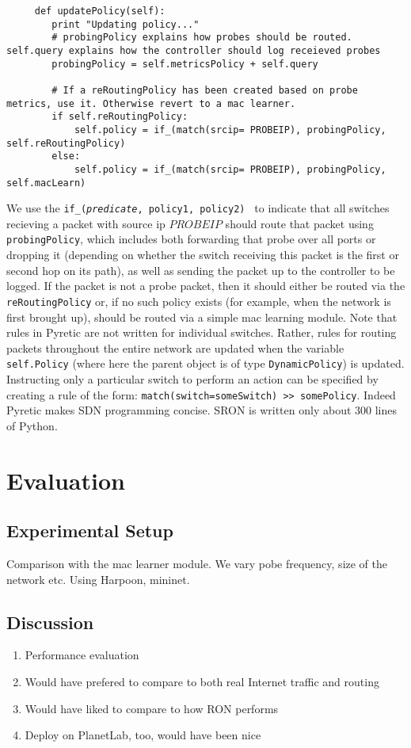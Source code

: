 \documentclass[pageno]{jpaper}
\begin{document}
	\begin{lstlisting}
	 def updatePolicy(self):
		print "Updating policy..."
		# probingPolicy explains how probes should be routed. self.query explains how the controller should log receieved probes
		probingPolicy = self.metricsPolicy + self.query

		# If a reRoutingPolicy has been created based on probe metrics, use it. Otherwise revert to a mac learner.
		if self.reRoutingPolicy:	
			self.policy = if_(match(srcip= PROBEIP), probingPolicy, self.reRoutingPolicy)
		else:
			self.policy = if_(match(srcip= PROBEIP), probingPolicy, self.macLearn)
	\end{lstlisting} 

We use the {\tt if\_({\it predicate}, policy1, policy2) } to indicate that all switches recieving a packet with source ip $PROBEIP$ should route that packet using {\tt probingPolicy}, which includes both forwarding that probe over all ports or dropping it (depending on whether the switch receiving this packet is the first or second hop on its path), as well as sending the packet up to the controller to be logged.  If the packet is not a probe packet, then it should either be routed via the {\tt reRoutingPolicy} or, if no such policy exists (for example, when the network is first brought up), should be routed via a simple mac learning module.  Note that rules in Pyretic are not written for individual switches.  Rather, rules for routing packets throughout the entire network are updated when the variable {\tt self.Policy} (where here the parent object is of type {\tt DynamicPolicy}) is updated.  Instructing only a particular switch to perform an action can be specified by creating a rule of the form: {\tt match(switch=someSwitch) >> somePolicy}.  Indeed Pyretic makes SDN programming concise. SRON is written only about 300 lines of Python.

\section{Evaluation}
\subsection{Experimental Setup}
Comparison with the mac learner module. We vary pobe frequency, size of the network etc.
Using Harpoon, mininet.

\subsection{Discussion}
\begin{enumerate}
\item
Performance evaluation
\item
Would have prefered to compare to both real Internet traffic and routing
\item
Would have liked to compare to how RON performs
\item
Deploy on PlanetLab, too, would have been nice
\end{enumerate}
\end{document}
